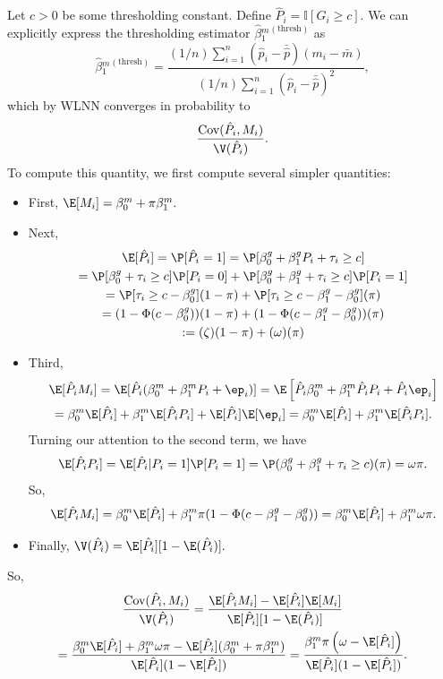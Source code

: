 \documentclass[12pt]{article}
\begin{document}
Let $c > 0$ be some thresholding constant. Define $\hat{P}_i = \mathbb{I} [G_i \geq c].$ We can explicitly express the thresholding estimator $\hat{\beta}{_1^m}^{(\textrm{thresh})}$ as
$$ \hat{\beta}{_1^m}^{(\textrm{thresh})} = \frac{ (1/n) \sum_{i=1}^n (\hat{p}_i - \bar{\hat{p}})(m_i - \bar{m})}{(1/n) \sum_{i=1}^n ( \hat{p}_i - \bar{\hat{p}})^2},$$ which by WLNN converges in probability to 
$$\frac{\textrm{Cov}(\hat{P}_i, M_i )}{\V( \hat{P}_i)}.$$
To compute this quantity, we first compute several simpler quantities:
\begin{itemize}
\item First, $\E[M_i] = \beta_0^m + \pi \beta_1^m.$
\item Next, \begin{multline*} \E[\hat{P}_i] = \P[\hat{P}_i = 1] = \P[\beta_0^g + \beta_1^g P_i + \tau_i \geq c ] \\ = \P[ \beta_0^g + \tau_i \geq c] \P[ P_i = 0 ] + \P[ \beta_0^g + \beta^g_1 + \tau_i \geq c ] \P[ P_i = 1] \\ =\P[\tau_i \geq c - \beta^g_0](1-\pi) + \P[ \tau_i \geq c - \beta_1^g - \beta_0^g ](\pi) \\ = (1 - \Phi( c - \beta_0^g)) (1 - \pi) + (1 - \Phi( c - \beta^g_1 - \beta^g_0)) (\pi) \\ := (\zeta)(1-\pi) + (\omega)(\pi)
\end{multline*}
\item Third, \begin{multline*}
\E[\hat{P}_i M_i] = \E[ \hat{P}_i ( \beta^m_0 + \beta^m_1 P_i + \ep_i ) ] = \E \left[ \hat{P}_i \beta^m_0 + \beta_1^m \hat{P}_i P_i + \hat{P}_i \ep_i \right] \\ =\beta^m_0 \E[\hat{P}_i] + \beta_1^m \E[ \hat{P}_i P_i] + \E[ \hat{P}_i ] \E[ \ep_i] = \beta^m_0 \E[ \hat{P}_i ] + \beta^m_1 \E[ \hat{P}_i P_i ].
\end{multline*} Turning our attention to the second term, we have
$$ \E[ \hat{P}_i P_i ] = \E[ \hat{P}_i | P_i = 1 ] \P[ P_i = 1 ] = \P( \beta_0^g + \beta_1^g + \tau_i \geq c ) (\pi) = \omega \pi.$$ So,
$$\E[ \hat{P}_i M_i ] = \beta_0^m\E[\hat{P}_i] + \beta_1^m \pi ( 1 - \Phi(c - \beta^g_1 -\beta_0^g )) = \beta_0^m \E[\hat{P}_i] + \beta_1^m \omega \pi .$$
\item Finally, $\V(\hat{P}_i) = \E[\hat{P}_i ] [ 1 - \E (\hat{P}_i)].$
\end{itemize}
So,
\begin{multline*}
\frac{ \textrm{Cov}(\hat{P}_i, M_i)}{ \V(\hat{P}_i)}  = \frac{ \E[ \hat{P}_i M_i] - \E[ \hat{P}_i ] \E[ M_i ]}{ \E[ \hat{P}_i ] [1 - \E( \hat{P}_i)]} \\ = \frac{\beta^m_0 \E[\hat{P}_i] + \beta^m_1 \omega \pi - \E[ \hat{P}_i ] ( \beta_0^m + \pi \beta_1^m ) }{ \E[ \hat{P}_i] ( 1 - \E[\hat{P}_i])} = \frac{\beta_1^m \pi \left(\omega - \E[\hat{P}_i] \right) }{ \E[ \hat{P}_i] ( 1 - \E[\hat{P}_i])}. 
\end{multline*}
\end{document}

